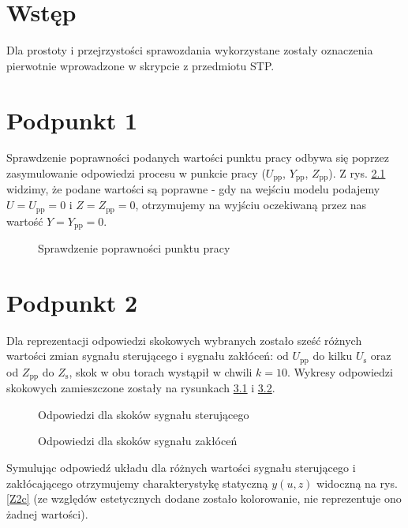\chapter{Wstęp}
Dla prostoty i przejrzystości sprawozdania wykorzystane zostały oznaczenia pierwotnie wprowadzone w skrypcie z przedmiotu STP.

\chapter{Podpunkt 1}
Sprawdzenie poprawności podanych wartości punktu pracy odbywa się poprzez zasymulowanie odpowiedzi procesu w punkcie pracy ($U_{\mathrm{pp}}$, $Y_{\mathrm{pp}}$, $Z_{\mathrm{pp}}$). Z rys. \ref{Z1} widzimy, że podane wartości są poprawne - gdy na wejściu modelu podajemy $U=U_{\mathrm{pp}}=0$ i $Z=Z_{\mathrm{pp}}=\num{0}$, otrzymujemy na wyjściu oczekiwaną przez nas wartość $Y=Y_{\mathrm{pp}}=\num{0}$.

\begin{figure}[ht]
\centering

\caption{Sprawdzenie poprawności punktu pracy}
\label{Z1}
\end{figure}


\chapter{Podpunkt 2}
Dla reprezentacji odpowiedzi skokowych wybranych zostało sześć różnych wartości zmian sygnału sterującego i sygnału zakłóceń: od $U_{\mathrm{pp}}$ do kilku $U_{\mathrm{s}}$ oraz od $Z_{\mathrm{pp}}$ do  $Z_{\mathrm{s}}$, skok w obu torach wystąpił w chwili $k=10$. Wykresy odpowiedzi skokowych zamieszczone zostały na rysunkach \ref{Z2a} i \ref{Z2b}.

\begin{figure}[ht]
\centering

\caption{Odpowiedzi dla skoków sygnału sterującego} 
\label{Z2a}
\end{figure}

\begin{figure}[ht]
\centering

\caption{Odpowiedzi dla skoków sygnału zakłóceń}
\label{Z2b}
\end{figure}

Symulując odpowiedź układu dla różnych wartości sygnału sterującego i zakłócającego otrzymujemy charakterystykę statyczną $y(u,z)$ widoczną na rys. \ref{Z2c} (ze względów estetycznych dodane zostało kolorowanie, nie reprezentuje ono żadnej wartości).

